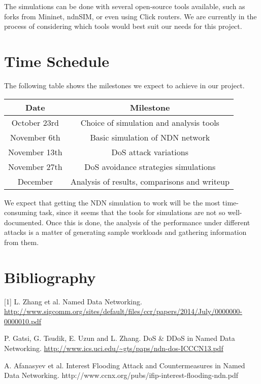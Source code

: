 \documentclass[12pt]{article}
\begin{document}
The simulations can be done with several open-source tools available, such as forks from Mininet, ndnSIM, or even using Click routers. We are currently in the process of considering which tools would best suit our needs for this project.

\section{Time Schedule}

The following table shows the milestones we expect to achieve in our project.

\begin{center}
\begin{tabular}{c|c}
\textbf{Date} & \textbf{Milestone} \\
\hline 
October 23rd & Choice of simulation and analysis tools \\
\hline
November 6th & Basic simulation of NDN network \\
\hline
November 13th & DoS attack variations \\
\hline
November 27th & DoS avoidance strategies simulations \\
\hline
December & Analysis of results, comparisons and writeup
\end{tabular}
\end{center}

We expect that getting the NDN simulation to work will be the most time-consuming task, since it seems that the tools for simulations are not so well-documented. Once this is done, the analysis of the performance under different attacks is a matter of generating sample workloads and gathering information from them.

\section{Bibliography}

[1] L. Zhang et al. Named Data Networking. \url{http://www.sigcomm.org/sites/default/files/ccr/papers/2014/July/0000000-0000010.pdf}

\medskip

\noindent [2] P. Gatsi, G. Tsudik, E. Uzun and L. Zhang. DoS \& DDoS in Named Data Networking. \url{http://www.ics.uci.edu/~gts/paps/ndn-dos-ICCCN13.pdf}

\medskip

\noindent [3] A. Afanasyev et al. Interest Flooding Attack and Countermeasures in
Named Data Networking. http://www.ccnx.org/pubs/ifip-interest-flooding-ndn.pdf
\end{document}
